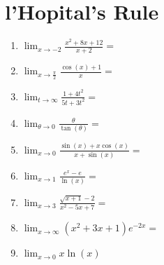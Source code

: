 \documentclass[12pt]{report}
\begin{document}
\newcommand{\less}{\textless}
\newcommand{\greater}{\textgreater}
\newcommand{\reals}{\mathbb{R}}
\newcommand{\integers}{\mathbb{Z}}
\newcommand{\rationals}{\mathbb{Q}}
\newcommand{\dsp}{\displaystyle}

\section*{l'Hopital's Rule}

\begin{enumerate}

\item $\dsp \lim_{x \to -2} \frac{x^2+8x+12}{x+2} =$

	\item $\dsp \lim_{x \to \frac{\pi}{2}} \frac{\cos(x)+1}{x} =$

	\item $\dsp \lim_{t \to \infty} \frac{1 + 4t^2}{5t + 3t^2} =$

	\item $\dsp \lim_{\theta \to 0} \frac{\theta}{\tan(\theta)} =$
	
	\item $\dsp \lim_{x \to 0} \frac{\sin(x)+x\cos(x)}{x+\sin(x)}=$

\item $\dsp \lim_{x \to 1} \frac{e^x-e}{\ln(x)}=$

\item $\dsp \lim_{x \to 3} \frac{\sqrt{x+1}-2}{x^2-5x+7}=$

\item $\dsp \lim_{x \to \infty} (x^2+3x+1)e^{-2x}=$

\item $\lim_{x\rightarrow 0}x\ln(x)$

\end{enumerate}
\end{document}
